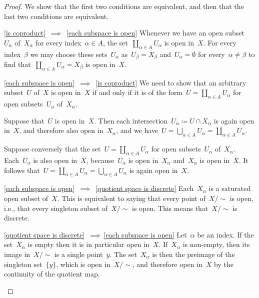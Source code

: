 \begin{proof}
	We show that the first two conditions are equivalent, and then that the last two conditions are equivalent.
	\begin{implicationslist}

	\item[\ref{is coproduct}~$\implies$~\ref{each subspace is open}]
		Whenever we have an open subset~$U_α$ of~$X_α$ for every index~$α ∈ A$, the set~$∐_{α ∈ A} U_α$ is open in~$X$.
		For every index~$β$ we may choose these sets~$U_α$ as~$U_β = X_β$ and~$U_α = ∅$ for every~$α ≠ β$ to find that~$∐_{α ∈ A} U_α = X_β$ is open in~$X$.

	\item[\ref{each subspace is open}~$\implies$~\ref{is coproduct}]
		We need to show that an arbitrary subset~$U$ of~$X$ is open in~$X$ if and only if it is of the form~$U = ∐_{α ∈ A} U_α$ for open subsets~$U_α$ of~$X_α$.

		Suppose that~$U$ is open in~$X$.
		Then each intersection~$U_α ≔ U ∩ X_α$ is again open in~$X$, and therefore also open in~$X_α$, and we have~$U = ⋃_{α ∈ A} U_α = ∐_{α ∈ A} U_α$.

		Suppose conversely that the set~$U = ∐_{α ∈ A} U_α$ for open subsets~$U_α$ of~$X_α$.
		Each~$U_α$ is also open in~$X$, because~$U_α$ is open in~$X_α$ and~$X_α$ is open in~$X$.
		It follows that~$U = ∐_{α ∈ A} U_α = ⋃_{α ∈ A} U_α$ is again open in~$X$.

	\item[\ref{each subspace is open}~$\implies$~\ref{quotient space is discrete}]
		Each~$X_α$ is a saturated open subset of~$X$.
		This is equivalent to saying that every point of~$X / {∼}$ is open, i.e., that every singleton subset of~$X / {∼}$ is open.
		This means that~$X / {∼}$ is discrete.

	\item[\ref{quotient space is discrete}~$\implies~$\ref{each subspace is open}]
		Let~$α$ be an index.
		If the set~$X_α$ is empty then it is in particular open in~$X$.
		If~$X_α$ is non-empty, then its image in~$X / {∼}$ is a single point~$y$.
		The set~$X_α$ is then the preimage of the singleton set~$\{ y \}$, which is open in~$X / {∼}$, and therefore open in~$X$ by the continuity of the quotient map.
	\qedhere

	\end{implicationslist}
\end{proof}

